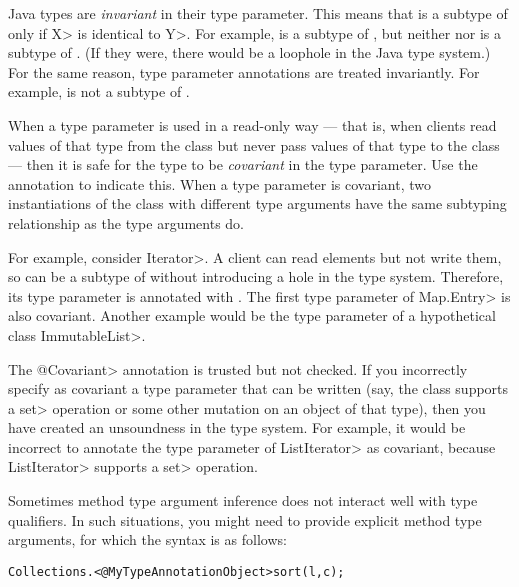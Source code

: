 
Java types are \emph{invariant} in their type parameter.  This means that
 is a subtype of  only if \<X> is identical to \<Y>.  For
example,  is a subtype of , but
neither  nor  is a subtype of
.  (If they were, there would be a loophole in the Java
type system.)  For the same reason, type parameter annotations are treated
invariantly.  For example,  is not a subtype
of .

When a type parameter is used in a read-only way --- that is, when clients
read values of that type from the class but never pass values of that type
to the class --- then it is safe for the
type to be \emph{covariant} in the type parameter.  Use the
 annotation to indicate this.
When a type parameter is covariant, two instantiations of the class with
different type arguments have the same subtyping relationship as the type
arguments do.

For example, consider \<Iterator>.  A client can read elements but not
write them, so  can be a subtype of
 without introducing a hole in the type system.
Therefore, its type parameter is annotated with
.
The first type parameter of \<Map.Entry> is also covariant.
Another example would be the type parameter of a hypothetical class
\<ImmutableList>.

The \<@Covariant> annotation is trusted but not checked.
If you incorrectly specify as covariant a type parameter that can be
written (say, the class supports a
\<set> operation or some other mutation on an object of that type), then
you have created an unsoundness in the type system.
For example, it would be incorrect to annotate the type parameter of
\<ListIterator> as covariant, because \<ListIterator> supports a \<set>
operation.



Sometimes method type argument inference does not interact well with
type qualifiers. In such situations, you might need to provide
explicit method type arguments, for which the syntax is as follows:

\begin{alltt}
    Collections.<@MyTypeAnnotation Object>sort(l, c);
\end{alltt}


